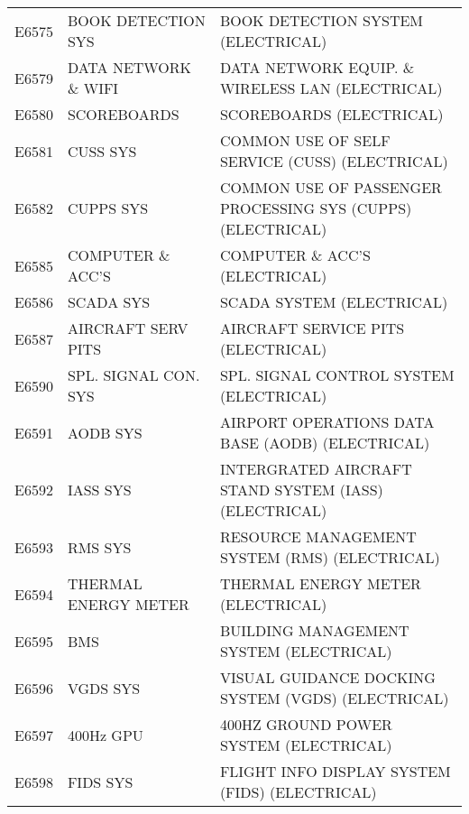 \begin{longtable}[l]{l%
                  l|%
                  l|}
\rowcolor{thetableheadbgcolor!0.25!white} E6575       & BOOK DETECTION SYS   & BOOK DETECTION SYSTEM (ELECTRICAL)   \\
\rowcolor{thetableheadbgcolor!0.25!white} E6579       & DATA NETWORK \& WIFI   & DATA NETWORK EQUIP. \& WIRELESS LAN (ELECTRICAL)   \\
\rowcolor{thetableheadbgcolor!0.25!white} E6580       & SCOREBOARDS   & SCOREBOARDS (ELECTRICAL)   \\
\rowcolor{thetableheadbgcolor!0.25!white} E6581       & CUSS SYS   & COMMON USE OF SELF SERVICE (CUSS) (ELECTRICAL)   \\
\rowcolor{thetableheadbgcolor!0.25!white} E6582       & CUPPS SYS   & COMMON USE OF PASSENGER PROCESSING SYS (CUPPS) (ELECTRICAL)   \\
\rowcolor{thetableheadbgcolor!0.25!white} E6585       & COMPUTER \& ACC'S   & COMPUTER \& ACC'S (ELECTRICAL)   \\
\rowcolor{thetableheadbgcolor!0.25!white} E6586       & SCADA SYS   & SCADA SYSTEM (ELECTRICAL)   \\
\rowcolor{thetableheadbgcolor!0.25!white} E6587       & AIRCRAFT SERV PITS   & AIRCRAFT SERVICE PITS (ELECTRICAL)   \\
\rowcolor{thetableheadbgcolor!0.25!white} E6590       & SPL. SIGNAL CON. SYS   & SPL. SIGNAL CONTROL SYSTEM (ELECTRICAL)   \\
\rowcolor{thetableheadbgcolor!0.25!white} E6591       & AODB SYS   & AIRPORT OPERATIONS DATA BASE (AODB) (ELECTRICAL)   \\
\rowcolor{thetableheadbgcolor!0.25!white} E6592       & IASS SYS   & INTERGRATED AIRCRAFT STAND SYSTEM (IASS) (ELECTRICAL)   \\
\rowcolor{thetableheadbgcolor!0.25!white} E6593       & RMS SYS   & RESOURCE MANAGEMENT SYSTEM (RMS) (ELECTRICAL)   \\
\rowcolor{thetableheadbgcolor!0.25!white} E6594       & THERMAL ENERGY METER   & THERMAL ENERGY METER (ELECTRICAL)   \\
\rowcolor{thetableheadbgcolor!0.25!white} E6595       & BMS   & BUILDING MANAGEMENT SYSTEM (ELECTRICAL)   \\
\rowcolor{thetableheadbgcolor!0.25!white} E6596       & VGDS SYS   & VISUAL GUIDANCE DOCKING SYSTEM (VGDS) (ELECTRICAL)   \\
\rowcolor{thetableheadbgcolor!0.25!white} E6597       & 400Hz GPU   & 400HZ GROUND POWER SYSTEM (ELECTRICAL)   \\
\rowcolor{thetableheadbgcolor!0.25!white} E6598       & FIDS SYS   & FLIGHT INFO DISPLAY SYSTEM (FIDS) (ELECTRICAL)   \\

\end{longtable}
